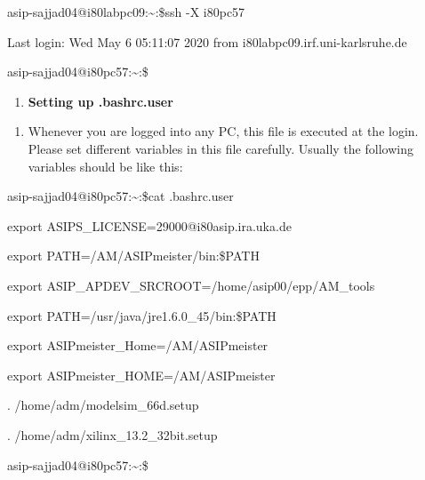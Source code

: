 \documentclass[
]{article}
\begin{document}
asip-sajjad04@i80labpc09:\textasciitilde:\$ssh -X i80pc57

Last login: Wed May 6 05:11:07 2020 from i80labpc09.irf.uni-karlsruhe.de

asip-sajjad04@i80pc57:\textasciitilde:\$

\begin{enumerate}
\def\labelenumi{\Alph{enumi}.}
\setcounter{enumi}{9}
\item
  \textbf{Setting up .bashrc.user}
\end{enumerate}

\begin{enumerate}
\def\labelenumi{\arabic{enumi}.}
\setcounter{enumi}{12}
\item
  Whenever you are logged into any PC, this file is executed at the
  login. Please set different variables in this file carefully. Usually
  the following variables should be like this:
\end{enumerate}

asip-sajjad04@i80pc57:\textasciitilde:\$cat .bashrc.user

export ASIPS\_LICENSE=29000@i80asip.ira.uka.de

export PATH=/AM/ASIPmeister/bin:\$PATH

export ASIP\_APDEV\_SRCROOT=/home/asip00/epp/AM\_tools

export PATH=/usr/java/jre1.6.0\_45/bin:\$PATH

export ASIPmeister\_Home=/AM/ASIPmeister

export ASIPmeister\_HOME=/AM/ASIPmeister

. /home/adm/modelsim\_66d.setup

. /home/adm/xilinx\_13.2\_32bit.setup

asip-sajjad04@i80pc57:\textasciitilde:\$
\end{document}
